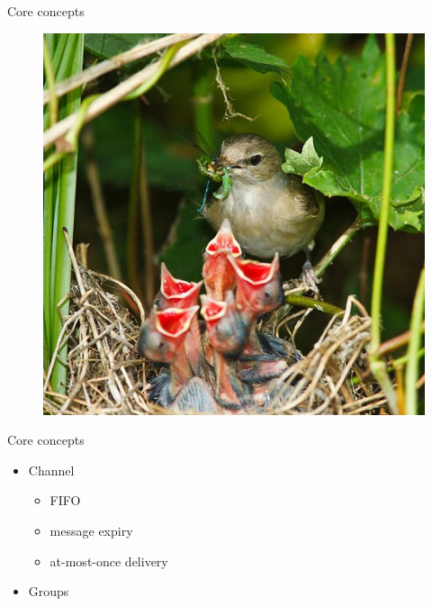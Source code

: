 \documentclass{beamer}
\begin{document}
\begin{frame}{Core concepts}
	\begin{center}
		\begin{figure}
			\includegraphics[scale=0.3]{bird.jpg}
		\end{figure}
	\end{center}
\end{frame}

\begin{frame}{Core concepts}
	\begin{adjustwidth}{2em}{2.5em}
	\begin{itemize}
		\item Channel
			\begin{itemize}
				\item FIFO
				\item message expiry
				\item at-most-once delivery
			\end{itemize}
		\item Groups
	\end{itemize}
	\end{adjustwidth}
\end{frame}
\end{document}
